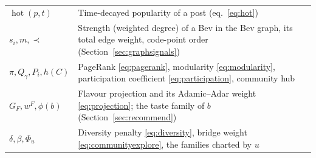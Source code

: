 \documentclass[11pt]{article}
\DeclareMathOperator{\hot}{hot}
\theoremstyle{plain}
\theoremstyle{definition}
\theoremstyle{remark}
\begin{document}
\begin{center}
\begin{tabular}{@{}lp{10cm}@{}}
$\hot(p, t)$ & Time-decayed popularity of a post (eq.~\ref{eq:hot}) \\
$s_i, m, \prec$ & Strength (weighted degree) of a Bev in the Bev graph, its total edge weight, code-point order (Section~\ref{sec:graphsignals}) \\
$\pi, Q_\gamma, P_i, h(C)$ & PageRank \eqref{eq:pagerank}, modularity \eqref{eq:modularity}, participation coefficient \eqref{eq:participation}, community hub \\
$G_F, w^F, \phi(b)$ & Flavour projection and its Adamic--Adar weight \eqref{eq:projection}; the taste family of $b$ (Section~\ref{sec:recommend}) \\
$\delta, \beta, \Phi_u$ & Diversity penalty \eqref{eq:diversity}, bridge weight \eqref{eq:communityexplore}, the families charted by $u$ \\
\bottomrule
\end{tabular}
\end{center}
\end{document}
